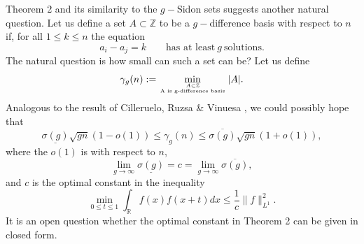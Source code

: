 \documentclass{amsart}
\theoremstyle{remark}
\begin{document}
Theorem 2 and its similarity to the $g-$Sidon sets suggests another natural question. Let us define a set $A \subset \mathbb{Z}$ to be a $g-$difference basis with respect to $n$ if, for all $1 \leq k \leq n$ the equation
$$ a_i - a_j = k \qquad\mbox{has at least}~g~\mbox{solutions}.$$
The natural question is how small can such a set can be? Let us define
$$ \gamma_g(n) := \min_{A \subset \mathbb{Z} \atop \mbox{\tiny A is g-difference basis}}{|A|}.$$
Analogous to the result of Cilleruelo, Ruzsa \& Vinuesa \cite{cill2}, we could possibly hope that
$$\underline{\sigma(g)}\sqrt{gn}(1-o(1)) \leq \gamma_g(n) \leq \overline{\sigma(g)}\sqrt{gn}(1+o(1)),$$
where the $o(1)$ is with respect to $n$, 
$$ \lim_{g \rightarrow \infty}{\underline{\sigma(g)}} = c = \lim_{g \rightarrow \infty}{\overline{\sigma(g)}},$$
and $c$ is the optimal constant in the inequality
$$ \min_{0 \leq t \leq 1}{\int_{\mathbb{R}} f(x) f(x+t) dx} \leq  \frac{1}{c}\|f\|_{L^1}^2.$$
It is an open question whether the optimal constant in Theorem 2 can be given in closed form.
\end{document}
